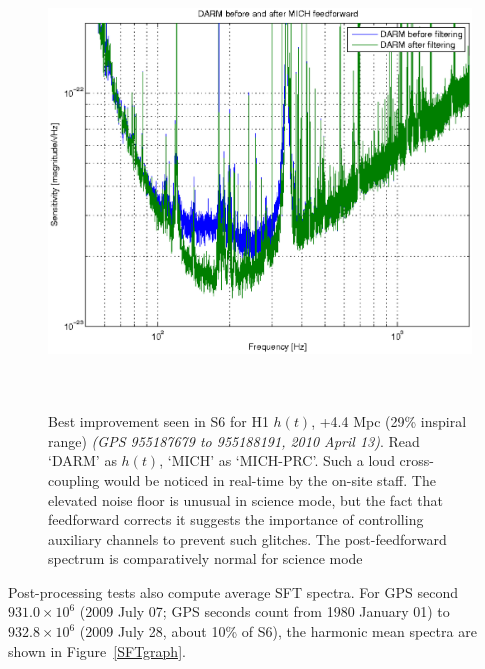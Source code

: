 \begin{figure}
\begin{center}
\includegraphics[height=120mm, width=150mm]{figure12.eps}
\caption{Best improvement seen in S6 for H1 $h(t)$, +4.4 Mpc (29\% inspiral range)
\textit{(GPS 955187679 to 955188191, 2010 April 13)}. Read `DARM' as $h(t)$, `MICH' as `MICH-PRC'. Such a loud cross-coupling would be noticed in real-time by the on-site staff. The elevated noise floor is unusual in science mode, but the fact that feedforward corrects it suggests the importance of controlling auxiliary channels to prevent such glitches. The post-feedforward spectrum is comparatively normal for science mode}
\label{bestInspiralGraph}
\end{center}
\end{figure}

Post-processing tests also compute average SFT spectra. For GPS second $931.0\times 10^6$ (2009 July 07; GPS seconds count from 1980 January 01) to $932.8\times 10^6$ (2009 July 28, about 10\% of S6), the harmonic mean spectra are shown in Figure~\ref{SFTgraph}.

